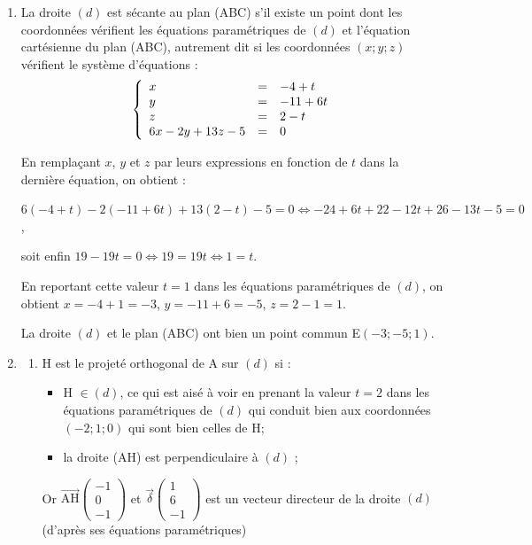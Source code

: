 \documentclass[10pt]{article}
\providecommand{\vect}[1]{\overrightarrow{#1}}
\begin{document}
\begin{enumerate}
	Or $\vect{n} \cdot \vect{p} = 6 \times 8 - 2 \times (- 2) + 13 \times (- 4) = 48 + 4 - 52 = 0$ : d'après la propriété admise les deux vecteurs normaux aux deux plans sont orthogonaux donc les deux plans sont orthogonaux.

	\item La droite $(d)$ est sécante au plan (ABC) s'il existe un point dont les coordonnées vérifient les équations paramétriques de $(d)$ et l'équation cartésienne du plan (ABC), autrement dit si les coordonnées $(x ; y ; z)$ vérifient le système d'équations :
		\[\left\{\begin{array}{l c l}
			x&=&- 4 + t\\
			y&=&- 11 + 6t\\
			z&=&2 - t\\
			6x - 2y + 13z - 5 &=& 0
		\end{array}\right.\]

		En remplaçant $x$, $y$ et $z$ par leurs expressions en fonction de $t$ dans la dernière équation, on obtient :

		$6(- 4 + t)- 2(- 11 + 6t) + 13(2 - t) - 5 = 0 \iff - 24 + 6t + 22 - 12t + 26 - 13t - 5 = 0$,

		soit enfin \quad $19 - 19t = 0 \iff 19 = 19t \iff 1 = t$.

		En reportant cette valeur $t = 1$ dans les équations paramétriques de $(d)$, on obtient \quad $x = - 4 + 1 = - 3$, \: $y = - 11 + 6 = - 5$, \:$z = 2 - 1 = 1$.

		La droite $(d)$ et le plan (ABC) ont bien un point commun E$(- 3 ; -5 ; 1)$.

		\item \begin{enumerate}
			\item H est le projeté orthogonal de A sur $(d)$ si :

			\begin{itemize}
				\item  H $\in (d)$, ce qui est aisé à voir en prenant la valeur $t = 2$ dans les équations paramétriques de $(d)$ qui conduit bien aux coordonnées $(- 2 ; 1 ; 0)$ qui sont bien celles de H;
				\item la droite (AH) est perpendiculaire à $(d)$ ;
			\end{itemize}

			Or $\vect{\text{AH}}\begin{pmatrix}-1\\0\\- 1\end{pmatrix}$ et $\vect{\delta}\begin{pmatrix}1\\6\\- 1\end{pmatrix}$ est un vecteur directeur de la droite $(d)$ (d'après ses équations paramétriques)


\end{enumerate}
\end{enumerate}
\end{document}

